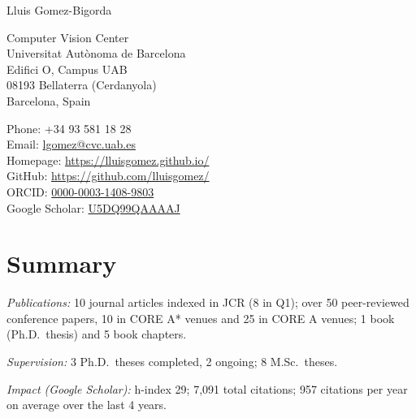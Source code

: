 \documentclass[11pt]{article}
\newenvironment{entries}{%
  \begin{list}{}{\setlength{\leftmargin}{3em}\setlength{\itemindent}{-1.5em}%
    \setlength{\itemsep}{0.35em}\setlength{\parsep}{0pt}\setlength{\topsep}{0.2em}}}%
  {\end{list}}
\begin{document}
\thispagestyle{plain}

{\huge Lluis Gomez-Bigorda}\par
\vspace{1.2em}
{\small
\begin{minipage}[t]{0.5\textwidth}
Computer Vision Center\\
Universitat Autònoma de Barcelona\\
Edifici O, Campus UAB\\
08193 Bellaterra (Cerdanyola)\\
Barcelona, Spain
\end{minipage}%
\begin{minipage}[t]{0.5\textwidth}
Phone: +34 93 581 18 28\\
Email: \href{mailto:lgomez@cvc.uab.es}{lgomez@cvc.uab.es}\\
Homepage: \url{https://lluisgomez.github.io/}\\
GitHub: \url{https://github.com/lluisgomez/}\\
ORCID: \href{https://orcid.org/0000-0003-1408-9803}{0000-0003-1408-9803}\\
Google Scholar: \href{https://scholar.google.es/citations?user=U5DQ99QAAAAJ}{U5DQ99QAAAAJ}
\end{minipage}}

\section*{Summary}
\begin{entries}
\item \textit{Publications:} 10 journal articles indexed in JCR (8 in Q1); over 50 peer-reviewed conference papers, 10 in CORE A* venues and 25 in CORE A venues; 1 book (Ph.D.\ thesis) and 5 book chapters.
\item \textit{Supervision:} 3 Ph.D.\ theses completed, 2 ongoing; 8 M.Sc.\ theses.
\item \textit{Impact (Google Scholar):} h-index 29; 7,091 total citations; 957 citations per year on average over the last 4 years.
\end{entries}

\end{document}
